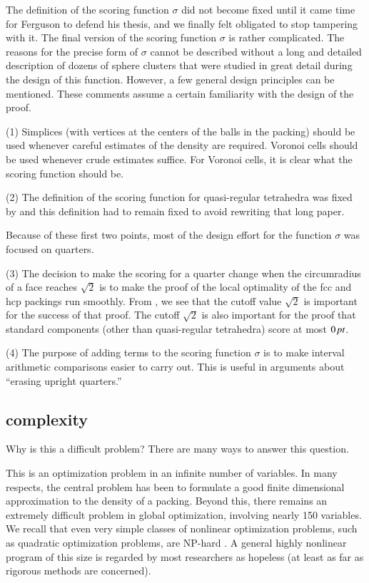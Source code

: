 The definition of the scoring function $\sigma$ did not become
fixed until it came time for Ferguson to defend his thesis, and we
finally felt obligated to stop tampering with it.  The final
version of the scoring function $\sigma$ is rather complicated.
The reasons for the precise form of $\sigma$ cannot be described
without a long and detailed description of dozens of sphere
clusters that were studied in great detail during the design of
this function. However, a few general design principles can be
mentioned.  These comments assume a certain familiarity with the
design of the proof.


(1) Simplices (with vertices at the centers of the balls in the
packing) should be used whenever careful estimates of the density
are required.  Voronoi cells should be used whenever crude
estimates suffice.  For Voronoi cells, it is clear what the
scoring function should be.



(2) The definition of the scoring function for quasi-regular
tetrahedra was fixed by \cite{part1} and this definition had to
remain fixed to avoid rewriting that long paper.

Because of these first two points, most of the design effort for
the function $\sigma$ was focused on quarters.

(3)  The decision to make the scoring for a quarter change when
the circumradius of a face reaches $\sqrt2$ is to make the proof
of the local optimality of the fcc and hcp packings run smoothly.
From \cite{part2}, we see that the cutoff value $\sqrt2$ is
important for the success of that proof.  The cutoff $\sqrt2$ is
also important for the proof that standard components (other than
quasi-regular tetrahedra) score at most $0\,\hbox{\it pt}$.

(4) The purpose of adding terms to the scoring function $\sigma$
is to make
interval arithmetic comparisons
easier to carry out.  This is useful in arguments about ``erasing
upright quarters.''



\subsection{complexity}

Why is this a difficult problem?  There are many ways to answer this
question.

This is an optimization problem in an infinite number of
variables.  In many respects, the central problem has been to
formulate a good finite dimensional approximation to the density
of a packing.  Beyond this, there remains an extremely difficult
problem in global optimization, involving nearly 150 variables.
We recall that even very simple classes of nonlinear optimization
problems, such as quadratic optimization problems, are NP-hard
\cite{HoPT95}.  A general highly nonlinear program of this size is
regarded by most researchers as hopeless (at least as far as
rigorous methods are concerned).

